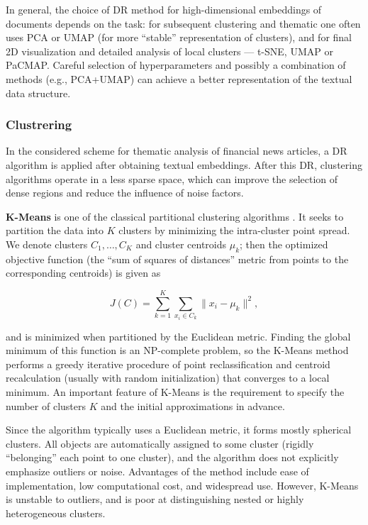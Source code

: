 In general, the choice of DR method for high-dimensional embeddings of documents depends
on the task: for subsequent clustering and thematic one often uses PCA or UMAP (for more “stable” representation
of clusters), and for final 2D visualization and detailed analysis of local clusters --- t-SNE, UMAP or PaCMAP.
Careful selection of hyperparameters and possibly a combination of methods (e.g., PCA+UMAP) can achieve a better
representation of the textual data structure.

\subsubsection{Clustrering}
In the considered scheme for thematic analysis of financial news articles, a DR
algorithm is applied after obtaining textual embeddings. After this DR,
clustering algorithms operate in a less sparse space, which can improve
the selection of dense regions and reduce the influence of noise factors.

\textbf{K-Means} is one of the classical partitional clustering algorithms \parencite{kmeans2010data}.
It seeks to partition the data into $K$ clusters by minimizing the intra-cluster point spread.
We denote clusters $C_1,\dots,C_K$ and cluster centroids $\mu_k$; then the optimized objective
function (the “sum of squares of distances” metric from points to the corresponding centroids)
is given as

\begin{equation}
    J(C)= \sum_{k=1}^K \sum_{x_i \in C_k} \|x_i - \mu_k\|^2,
\end{equation}

and is minimized when partitioned by the Euclidean metric. Finding the global minimum of this
function is an NP-complete problem, so the K-Means method performs a greedy iterative procedure
of point reclassification and centroid recalculation (usually with random initialization) that
converges to a local minimum. An important feature of K-Means is the requirement to specify
the number of clusters $K$ and the initial approximations in advance.

Since the algorithm typically uses a Euclidean metric, it forms mostly spherical clusters. All
objects are automatically assigned to some cluster (rigidly “belonging” each point to one cluster),
and the algorithm does not explicitly emphasize outliers or noise. Advantages of the method include
ease of implementation, low computational cost, and widespread use. However, K-Means is unstable
to outliers, and is poor at distinguishing nested or highly heterogeneous clusters.

